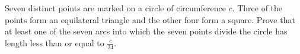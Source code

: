 \documentclass[varwidth]{standalone}
\begin{document}
    Seven distinct points are marked on a circle of circumference $c$. Three of the points form an equilateral triangle and the other four form a square. Prove that at least one of the seven arcs into which the seven points divide the circle has length less than or equal to $\frac{c}{24}$.
\end{document}
